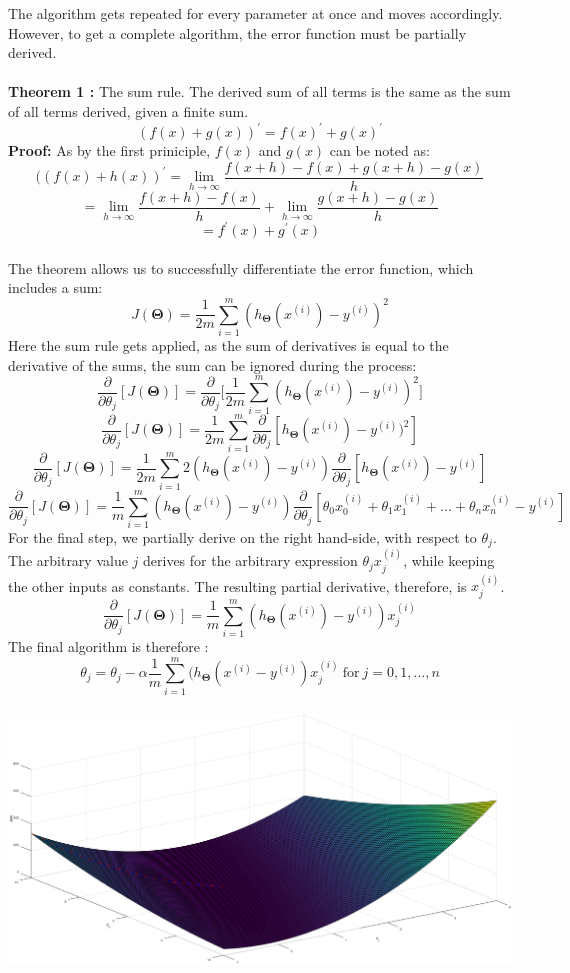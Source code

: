 \documentclass[a4paper,12pt]{article}
\begin{document}
The algorithm gets repeated for every parameter at once and moves accordingly. However, to get a complete algorithm, the error function must be partially derived. 
\\
\\
\textbf{Theorem 1 \cite{sumrule}:} The sum rule. The derived sum of all terms is the same as the sum of all terms derived, given a finite sum.
\[(f(x) + g(x))^{'} = f(x)^{'} + g(x)^{'} \]
\textbf{Proof:} As by the first priniciple, $f(x)$ and $g(x)$ can be noted as:
\[((f(x)+h(x))^{'} = \lim_{h\to\infty} \frac{f(x+h) - f(x) + g(x+h) - g(x)}{h}\] 
\[= \lim_{h\to\infty} \frac{f(x+h) - f(x)}{h} + \lim_{h\to\infty} \frac{g(x+h) - g(x)}{h}\]
\[= f^{'}(x) + g^{'}(x)\]
\\
The theorem allows us to successfully differentiate the error function, which includes a sum:
\[J(\boldsymbol{\Theta}) = \frac{1}{2m} \sum_{i=1}^m (h_{\boldsymbol{\Theta}}(x^{(i)}) - y^{(i)})^2\]
Here the sum rule gets applied, as the sum of derivatives is equal to the derivative of the sums, the sum can be ignored during the process:
\[\frac{\partial}{\partial\theta_j} [J(\boldsymbol{\Theta})] = \frac{\partial}{\partial\theta_j} \Big[ \frac{1}{2m} \sum_{i=1}^m (h_{\boldsymbol{\Theta}}(x^{(i)}) - y^{(i)})^2\Big]\]
\[\frac{\partial}{\partial\theta_j} [J(\boldsymbol{\Theta})] = \frac{1}{2m} \sum_{i=1}^m \frac{\partial}{\partial\theta_j} [h_{\boldsymbol{\Theta}}(x^{(i)}) - y^{(i)})^2]\]
\[\frac{\partial}{\partial\theta_j} [J(\boldsymbol{\Theta})] = \frac{1}{2m} \sum_{i=1}^m 2(h_{\boldsymbol{\Theta}}(x^{(i)}) - y^{(i)}) \frac{\partial}{\partial\theta_j}[h_{\boldsymbol{\Theta}}(x^{(i)}) - y^{(i)}]\]
\[\frac{\partial}{\partial\theta_j} [J(\boldsymbol{\Theta})] = \frac{1}{m} \sum_{i=1}^m (h_{\boldsymbol{\Theta}}(x^{(i)}) - y^{(i)})\frac{\partial}{\partial\theta_j} [\theta_0x_0^{(i)}+\theta_1x_1^{(i)}+...+\theta_nx_n^{(i)}-y^{(i)}]\]
For the final step, we partially derive on the right hand-side, with respect to $\theta_j$. The arbitrary value $j$ derives for the arbitrary expression $\theta_jx_j^{(i)}$, while keeping the other inputs as constants. The resulting partial derivative, therefore, is $x_j^{(i)}$.
\[\frac{\partial}{\partial\theta_j} [J(\boldsymbol{\Theta})] = \frac{1}{m} \sum_{i=1}^m (h_{\boldsymbol{\Theta}}(x^{(i)}) - y^{(i)})x_j^{(i)}\]
The final algorithm is therefore \cite{deeplearning}:
\[\theta_j = \theta_j - \alpha \frac{1}{m} \sum_{i=1}^m (h_{\boldsymbol{\Theta}}(x^{(i)} - y^{(i)})x_j^{(i)} \ \text{for} \ j = 0,1,...,n\]
\\
\includegraphics[scale=0.38]{gradientdescent}
\end{document}
